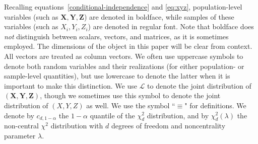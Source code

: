\documentclass[12pt]{article}
\theoremstyle{definition}
\theoremstyle{remark}
\newcommand{\prx}{\bm X}
\newcommand{\srx}{X}
\newcommand{\prz}{\bm Z}
\newcommand{\srz}{Z}
\newcommand{\pry}{{\bm Y}}
\newcommand{\sry}{Y}
\begin{document}
Recalling equations~\eqref{conditional-independence} and \eqref{eq:xyz}, population-level variables (such as $\prx,\pry,\prz$) are denoted in boldface, while samples of these variables (such as $\srx_i,\sry_i,\srz_i$) are denoted in regular font. Note that boldface does \textit{not} distinguish between scalars, vectors, and matrices, as it is sometimes employed. The dimensions of the object in this paper will be clear from context. All vectors are treated as column vectors. 
We often use uppercase symbols to denote both random variables and their realizations (for either population- or sample-level quantities), but use lowercase to denote the latter when it is important to make this distinction. We use $\mathcal L$ to denote the joint distribution of $(\prx,\pry,\prz)$, though we sometimes use this symbol to denote the joint distribution of $(\srx,\sry,\srz)$ as well. We use the symbol ``$\equiv$" for definitions. We denote by $c_{d,1-\alpha}$ the $1-\alpha$ quantile of the $\chi^2_d$ distribution, and by $\chi^2_d(\lambda)$ the non-central $\chi^2$ distribution with $d$ degrees of freedom and noncentrality parameter $\lambda$.
\end{document}
